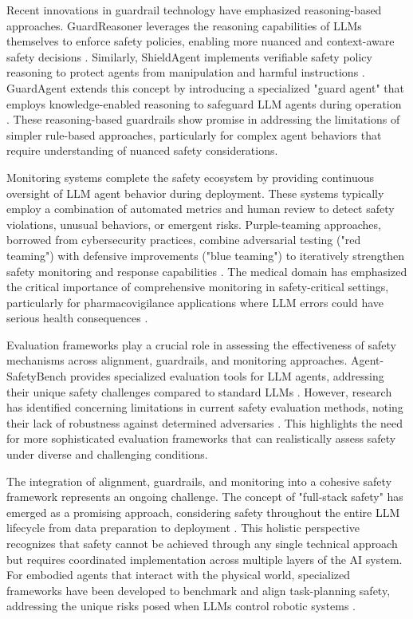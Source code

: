 \documentclass[conference]{IEEEtran}
\begin{document}
Recent innovations in guardrail technology have emphasized reasoning-based approaches. GuardReasoner leverages the reasoning capabilities of LLMs themselves to enforce safety policies, enabling more nuanced and context-aware safety decisions \cite{2501.18492}. Similarly, ShieldAgent implements verifiable safety policy reasoning to protect agents from manipulation and harmful instructions \cite{2503.22738}. GuardAgent extends this concept by introducing a specialized "guard agent" that employs knowledge-enabled reasoning to safeguard LLM agents during operation \cite{2406.09187}. These reasoning-based guardrails show promise in addressing the limitations of simpler rule-based approaches, particularly for complex agent behaviors that require understanding of nuanced safety considerations.

Monitoring systems complete the safety ecosystem by providing continuous oversight of LLM agent behavior during deployment. These systems typically employ a combination of automated metrics and human review to detect safety violations, unusual behaviors, or emergent risks. Purple-teaming approaches, borrowed from cybersecurity practices, combine adversarial testing ("red teaming") with defensive improvements ("blue teaming") to iteratively strengthen safety monitoring and response capabilities \cite{2407.01850}. The medical domain has emphasized the critical importance of comprehensive monitoring in safety-critical settings, particularly for pharmacovigilance applications where LLM errors could have serious health consequences \cite{2407.18322}.

Evaluation frameworks play a crucial role in assessing the effectiveness of safety mechanisms across alignment, guardrails, and monitoring approaches. Agent-SafetyBench provides specialized evaluation tools for LLM agents, addressing their unique safety challenges compared to standard LLMs \cite{2412.14470}. However, research has identified concerning limitations in current safety evaluation methods, noting their lack of robustness against determined adversaries \cite{2503.02574}. This highlights the need for more sophisticated evaluation frameworks that can realistically assess safety under diverse and challenging conditions.

The integration of alignment, guardrails, and monitoring into a cohesive safety framework represents an ongoing challenge. The concept of "full-stack safety" has emerged as a promising approach, considering safety throughout the entire LLM lifecycle from data preparation to deployment \cite{2504.15585}. This holistic perspective recognizes that safety cannot be achieved through any single technical approach but requires coordinated implementation across multiple layers of the AI system. For embodied agents that interact with the physical world, specialized frameworks have been developed to benchmark and align task-planning safety, addressing the unique risks posed when LLMs control robotic systems \cite{2504.14650}.
\end{document}
